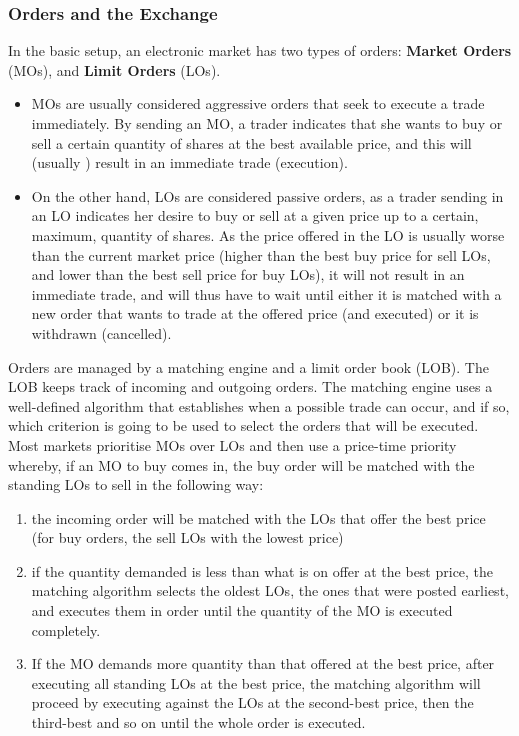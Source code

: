 \documentclass[11pt]{article}
\begin{document}
\subsubsection{Orders and the Exchange}
\label{sec:org2536d6b}
In the basic setup, an electronic market has two types of orders: \textbf{Market Orders} (MOs), and \textbf{Limit
Orders} (LOs).
\begin{itemize}
\item MOs are usually considered aggressive orders that seek to execute a trade immediately. By sending an
MO, a trader indicates that she wants to buy or sell a certain quantity of shares at the best
available price, and this will (usually ) result in an immediate trade (execution).
\item On the other hand, LOs are considered passive orders, as a trader sending in an LO indicates her
desire to buy or sell at a given price up to a certain, maximum, quantity of shares. As the price
offered in the LO is usually worse than the current market price (higher than the best buy price for
sell LOs, and lower than the best sell price for buy LOs), it will not result in an immediate trade,
and will thus have to wait until either it is matched with a new order that wants to trade at the
offered price (and executed) or it is withdrawn (cancelled).
\end{itemize}

Orders are managed by a matching engine and a limit order book (LOB). The LOB keeps track of incoming
and outgoing orders. The matching engine uses a well-defined algorithm that establishes when a
possible trade can occur, and if so, which criterion is going to be used to select the orders that
will be executed. Most markets prioritise MOs over LOs and then use a price-time priority whereby, if
an MO to buy comes in, the buy order will be matched with the standing LOs to sell in the following
way:
\begin{enumerate}
\item the incoming order will be matched with the LOs that offer the best price (for buy orders, the sell
LOs with the lowest price)
\item if the quantity demanded is less than what is on offer at the best price, the matching algorithm
selects the oldest LOs, the ones that were posted earliest, and executes them in order until the
quantity of the MO is executed completely.
\item If the MO demands more quantity than that offered at the best price, after executing all standing
LOs at the best price, the matching algorithm will proceed by executing against the LOs at the
second-best price, then the third-best and so on until the whole order is executed.
\end{enumerate}
\end{document}
